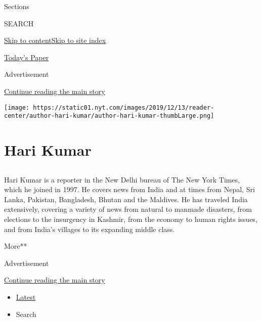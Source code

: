 Sections

SEARCH

\protect\hyperlink{site-content}{Skip to
content}\protect\hyperlink{site-index}{Skip to site index}

\href{https://myaccount.nytimes.com/auth/login?response_type=cookie\&client_id=vi}{}

\href{https://www.nytimes.com/section/todayspaper}{Today's Paper}

Advertisement

\protect\hyperlink{after-top}{Continue reading the main story}

\texttt{[image: https://static01.nyt.com/images/2019/12/13/reader-center/author-hari-kumar/author-hari-kumar-thumbLarge.png]}

\hypertarget{hari-kumar}{%
\section{Hari Kumar}\label{hari-kumar}}

\subsection{}

Hari Kumar is a reporter in the New Delhi bureau of The New York Times,
which he joined in 1997. He covers news from India and at times from
Nepal, Sri Lanka, Pakistan, Bangladesh, Bhutan and the Maldives. He has
traveled India extensively, covering a variety of news from natural to
manmade disasters, from elections to the insurgency in Kashmir, from the
economy to human rights issues, and from India's villages to its
expanding middle class.

More**

Advertisement

\protect\hyperlink{after-mid1}{Continue reading the main story}

\begin{itemize}
\tightlist
\item
  \protect\hyperlink{stream-panel}{Latest}
\item
  Search
\end{itemize}

